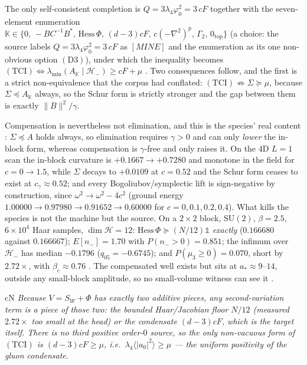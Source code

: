The only self-consistent completion is $Q=3\lambda_4\varphi_0^2=3\,cF$ together with the
seven-element enumeration $\mathbb K\in\{0,\,-BC^{-1}B^{*},\,\mathrm{Hess}\,\Phi,\,(d-3)cF,\,
c(-\nabla^2)^p,\,\Gamma_2,\,0_{\mathrm{top}}\}$ \LC{} (a choice: the source labels
$Q=3\lambda_4\varphi_0^2=3\,cF$ as $[MINE]$ and the enumeration as its one non-obvious option
$(\mathrm{D}3)$), under which the inequality becomes
$(\mathrm{TCI})\iff\lambda_{\min}(A_{\mathbb K}\mid\mathcal H_-)\ge cF+\mu$ \LT. Two consequences
follow, and the first is a strict non-equivalence that the corpus had conflated:
$(\mathrm{TCI})\not\Rightarrow\Sigma\succeq\mu$, because $\Sigma\preceq A_{\mathbb K}$ always, so
the Schur form is strictly stronger and the gap between them is exactly $\lVert B\rVert^2/\gamma$.

Compensation is nevertheless not elimination, and this is the species' real content \LT:
$\Sigma\preceq A$ holds always, so elimination requires $\gamma>0$ and can only \emph{lower} the
in-block form, whereas compensation is $\gamma$-free and only raises it. On the $4$D $L=1$ scan the
in-block curvature is $+0.1667\to+0.7280$ and monotone in the field for $c=0\to1.5$, while $\Sigma$
decays to $+0.0109$ at $c=0.52$ and the Schur form ceases to exist at $c_\gamma\approx0.52$; and
every Bogoliubov/symplectic lift is sign-negative by construction, since $\omega^2\to\omega^2-4c^2$
(ground energy $1.00000\to0.97980\to0.91652\to0.60000$ for $c=0,0.1,0.2,0.4$). What kills the
species is not the machine but the source. On a $2\times2$ block, $\mathrm{SU}(2)$, $\beta=2.5$,
$6\times10^4$ Haar samples, $\dim\mathcal H=12$: $\mathrm{Hess}\,\Phi\succeq(N/12)\mathbb 1$
\emph{exactly} ($0.166680$ against $0.166667$); $E[n_-]=1.70$ with $P(n_->0)=0.851$; the
infimum over $\mathcal H_-$ has median $-0.1796$ ($q_{05}=-0.6745$); and $P(\mu_3\ge0)=0.070$,
short by $2.72\times$, with $\beta_c\approx0.76$ \LE. The compensated well exists but sits at
$a_*\approx9$--$14$, outside any small-block amplitude, so no small-volume witness can see it \LE.

\begin{claimbox}{cN}
 \emph{Because $V=S_W+\Phi$ has exactly two
additive pieces, any second-variation term is a piece of those two: the bounded Haar/Jacobian floor
$N/12$ (measured $2.72\times$ too small at the head) or the condensate $(d-3)cF$, which is the
target itself. There is no third positive order-$0$ source, so the only non-vacuous form of
$(\mathrm{TCI})$ is $(d-3)cF\ge\mu$, i.e.\ $\lambda_4\langle\lvert a_0\rvert^2\rangle\ge\mu$ ---
the uniform positivity of the gluon condensate.}
\end{claimbox}

